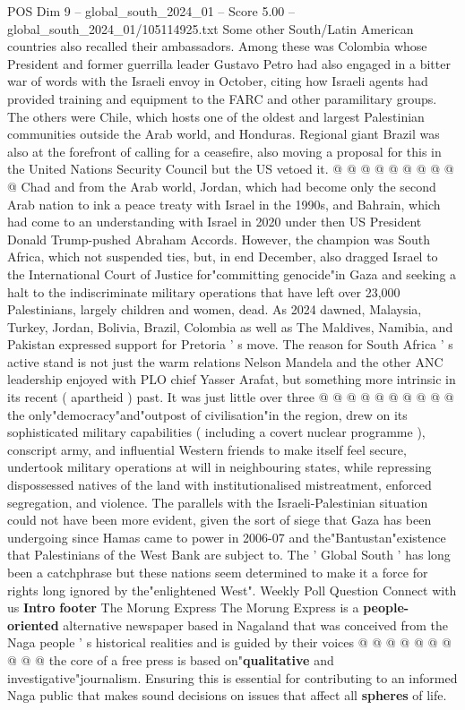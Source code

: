 \begin{textsample}{POS Dim 9 – global\_south\_2024\_01 – Score 5.00 – global\_south\_2024\_01/105114925.txt}
Some other South/Latin American countries also recalled their ambassadors.
Among these was Colombia whose President and former guerrilla leader Gustavo Petro had also engaged in a bitter war of words with the Israeli envoy in October, citing how Israeli agents had provided training and equipment to the FARC and other paramilitary groups.
The others were Chile, which hosts one of the oldest and largest Palestinian communities outside the Arab world, and Honduras.
Regional giant Brazil was also at the forefront of calling for a ceasefire, also moving a proposal for this in the United Nations Security Council but the US vetoed it. @ @ @ @ @ @ @ @ @ @ Chad and from the Arab world, Jordan, which had become only the second Arab nation to ink a peace treaty with Israel in the 1990s, and Bahrain, which had come to an understanding with Israel in 2020 under then US President Donald Trump-pushed Abraham Accords.
However, the champion was South Africa, which not suspended ties, but, in end December, also dragged Israel to the International Court of Justice for"committing genocide"in Gaza and seeking a halt to the indiscriminate military operations that have left over 23,000 Palestinians, largely children and women, dead.
As 2024 dawned, Malaysia, Turkey, Jordan, Bolivia, Brazil, Colombia as well as The Maldives, Namibia, and Pakistan expressed support for Pretoria ' s move.
The reason for South Africa ' s active stand is not just the warm relations Nelson Mandela and the other ANC leadership enjoyed with PLO chief Yasser Arafat, but something more intrinsic in its recent ( apartheid ) past.
It was just little over three @ @ @ @ @ @ @ @ @ @ the only"democracy"and"outpost of civilisation"in the region, drew on its sophisticated military capabilities ( including a covert nuclear programme ), conscript army, and influential Western friends to make itself feel secure, undertook military operations at will in neighbouring states, while repressing dispossessed natives of the land with institutionalised mistreatment, enforced segregation, and violence.
The parallels with the Israeli-Palestinian situation could not have been more evident, given the sort of siege that Gaza has been undergoing since Hamas came to power in 2006-07 and the"Bantustan"existence that Palestinians of the West Bank are subject to.
The ' Global South ' has long been a catchphrase but these nations seem determined to make it a force for rights long ignored by the"enlightened West".
Weekly Poll Question Connect with us \textbf{Intro} \textbf{footer} The Morung Express The Morung Express is a \textbf{people-oriented} alternative newspaper based in Nagaland that was conceived from the Naga people ' s historical realities and is guided by their voices @ @ @ @ @ @ @ @ @ @ the core of a free press is based on"\textbf{qualitative} and investigative"journalism.
Ensuring this is essential for contributing to an informed Naga public that makes sound decisions on issues that affect all \textbf{spheres} of life.

\end{textsample}
